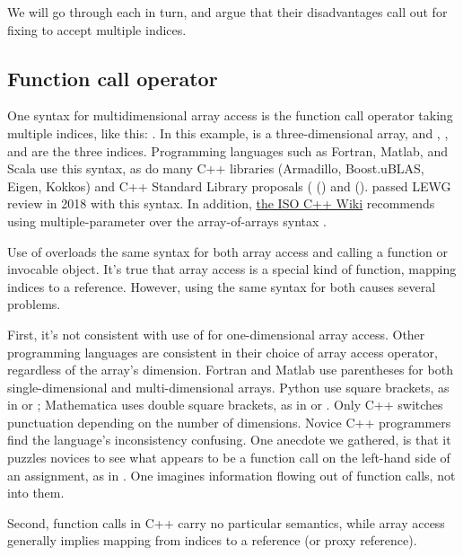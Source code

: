 \documentclass{wg21}
\begin{document}
We will go through each in turn, and argue that their disadvantages call out for fixing  to accept multiple indices.

\subsection{Function call operator}

One syntax for multidimensional array access is the function call operator taking multiple indices, like this: .  In this example,  is a three-dimensional array, and , , and  are the three indices.  Programming languages such as Fortran, Matlab, and Scala use this syntax, as do many C++ libraries (Armadillo, Boost.uBLAS, Eigen, Kokkos) and C++ Standard Library proposals ( () and  ().   passed LEWG review in 2018 with this syntax.  In addition, \href{https://isocpp.org/wiki/faq/operator-overloading#matrix-subscript-op}{the ISO C++ Wiki} recommends using multiple-parameter  over the array-of-arrays syntax .

Use of  overloads the same syntax for both array access and calling a function or invocable object.  It's true that array access is a special kind of function, mapping indices to a reference.  However, using the same syntax for both causes several problems.

First, it's not consistent with use of  for one-dimensional array access.  Other programming languages are consistent in their choice of array access operator, regardless of the array's dimension.  Fortran and Matlab use parentheses for both single-dimensional and multi-dimensional arrays.  Python use square brackets, as in  or ; Mathematica uses double square brackets, as in  or .  Only C++ switches punctuation depending on the number of dimensions.  Novice C++ programmers find the language's inconsistency confusing.  One anecdote we gathered, is that it puzzles novices to see what appears to be a function call on the left-hand side of an assignment, as in .  One imagines information flowing out of function calls, not into them.

Second, function calls in C++ carry no particular semantics, while array access generally implies mapping from indices to a reference (or proxy reference).
\end{document}
